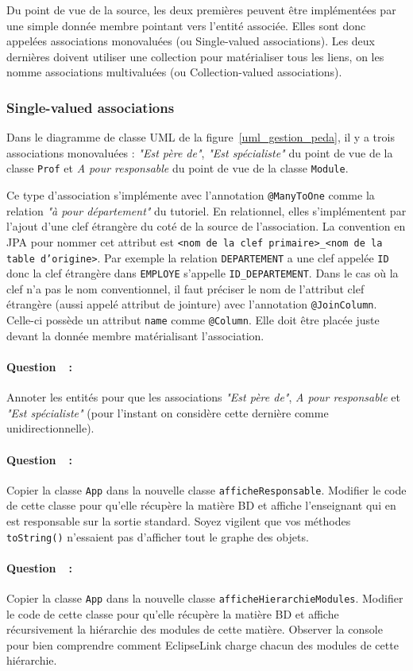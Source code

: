 \documentclass[a4paper,11pt]{article}
\newcounter{compteurQuestion}
\newcommand{\Question}{\paragraph*{Question~\thecompteurQuestion~:}\addtocounter{compteurQuestion}{1}}
\begin{document}
Du point de vue de la source, les deux premières peuvent être implémentées par une simple donnée membre pointant vers 
l'entité associée. Elles sont donc appelées associations monovaluées (ou Single-valued associations). Les deux 
dernières doivent utiliser une collection pour matérialiser tous les liens, on les nomme associations multivaluées 
(ou Collection-valued associations).
\subsubsection{Single-valued associations}
Dans le diagramme de classe UML de la figure~\ref{uml_gestion_peda}, il y a trois associations monovaluées : \textit{"Est père de"}, 
\textit{"Est spécialiste"} du point de vue de la classe \texttt{Prof} et \textit{A pour responsable} du point de 
vue de la classe \texttt{Module}.

Ce type d'association s'implémente avec l'annotation \texttt{@ManyToOne} comme la relation \textit{"à pour département"} 
du tutoriel. En relationnel, elles s'implémentent par l'ajout d'une clef étrangère du coté de la source de l'association.
La convention en JPA pour nommer cet attribut est \texttt{<nom de la clef primaire>\_<nom de la table d'origine>}. Par 
exemple la relation \texttt{DEPARTEMENT} a une clef appelée \texttt{ID} donc la clef étrangère dans \texttt{EMPLOYE} 
s'appelle \texttt{ID\_DEPARTEMENT}. Dans le cas où la clef n'a pas le nom conventionnel, il faut préciser le nom de 
l'attribut clef étrangère (aussi appelé attribut de jointure) avec l'annotation \texttt{@JoinColumn}. Celle-ci possède un 
attribut \texttt{name} comme \texttt{@Column}. Elle doit être placée juste devant la donnée membre matérialisant l'association. 

\Question Annoter les entités pour que les associations \textit{"Est père de"}, \textit{A pour responsable} et 
\textit{"Est spécialiste"} (pour l'instant on considère cette dernière comme unidirectionnelle).
\Question  Copier la classe \texttt{App} dans la nouvelle classe \texttt{afficheResponsable}. Modifier le code de cette classe 
pour qu'elle récupère la matière BD et affiche l'enseignant qui en est responsable sur la sortie standard. Soyez vigilent
que vos méthodes \texttt{toString()} n'essaient pas d'afficher tout le graphe des objets.

\Question  Copier la classe \texttt{App} dans la nouvelle classe \texttt{afficheHierarchieModules}. Modifier le code de 
cette classe pour qu'elle récupère la matière BD et affiche récursivement la hiérarchie des modules de cette matière. 
Observer la console pour bien comprendre comment EclipseLink charge chacun des modules de cette hiérarchie.
\end{document}
